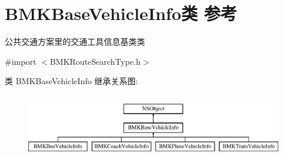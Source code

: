 \hypertarget{interface_b_m_k_base_vehicle_info}{}\section{B\+M\+K\+Base\+Vehicle\+Info类 参考}
\label{interface_b_m_k_base_vehicle_info}


公共交通方案里的交通工具信息基类类  




{\ttfamily \#import $<$B\+M\+K\+Route\+Search\+Type.\+h$>$}

类 B\+M\+K\+Base\+Vehicle\+Info 继承关系图\+:\begin{figure}[H]
\begin{center}
\leavevmode
\includegraphics[height=2.837838cm]{interface_b_m_k_base_vehicle_info}
\end{center}
\end{figure}
